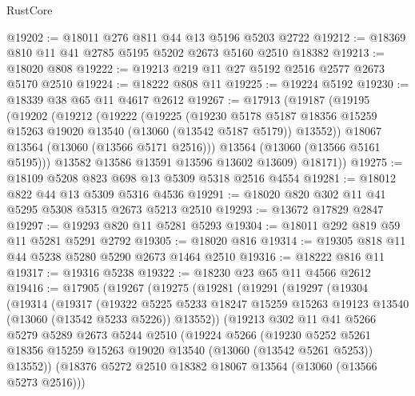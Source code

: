 \begin{lexlean}{RustCore}
\begin{coremodule}
@19202 := @18011 @276 @811 @44 @13 @5196 @5203 @2722
@19212 := @18369 @810 @11 @41 @2785 @5195 @5202 @2673 @5160 @2510 @18382
@19213 := @18020 @808
@19222 := @19213 @219 @11 @27 @5192 @2516 @2577 @2673 @5170 @2510
@19224 := @18222 @808 @11
@19225 := @19224 @5192
@19230 := @18339 @38 @65 @11 @4617 @2612
@19267 := @17913
    (@19187
      (@19195
        (@19202
          (@19212
            (@19222
              (@19225
                (@19230
                  @5178
                  @5187
                  @18356
                  @15259
                  @15263
                  @19020
                  @13540
                  (@13060 (@13542 @5187 @5179))
                  @13552))
              @18067
              @13564
              (@13060 (@13566 @5171 @2516)))
            @13564
            (@13060 (@13566 @5161 @5195)))
          @13582
          @13586
          @13591
          @13596
          @13602
          @13609)
        @18171))
@19275 := @18109 @5208 @823 @698 @13 @5309 @5318 @2516 @4554
@19281 := @18012 @822 @44 @13 @5309 @5316 @4536
@19291 := @18020 @820 @302 @11 @41 @5295 @5308 @5315 @2673 @5213 @2510
@19293 := @13672 @17829 @2847
@19297 := @19293 @820 @11 @5281 @5293
@19304 := @18011 @292 @819 @59 @11 @5281 @5291 @2792
@19305 := @18020 @816
@19314 := @19305 @818 @11 @44 @5238 @5280 @5290 @2673 @1464 @2510
@19316 := @18222 @816 @11
@19317 := @19316 @5238
@19322 := @18230 @23 @65 @11 @4566 @2612
@19416 := @17905
    (@19267
      (@19275
        (@19281
          (@19291
            (@19297
              (@19304
                (@19314
                  (@19317
                    (@19322
                      @5225
                      @5233
                      @18247
                      @15259
                      @15263
                      @19123
                      @13540
                      (@13060 (@13542 @5233 @5226))
                      @13552))
                  (@19213
                    @302
                    @11
                    @41
                    @5266
                    @5279
                    @5289
                    @2673
                    @5244
                    @2510
                    (@19224
                      @5266
                      (@19230
                        @5252
                        @5261
                        @18356
                        @15259
                        @15263
                        @19020
                        @13540
                        (@13060 (@13542 @5261 @5253))
                        @13552))
                    (@18376 @5272 @2510 @18382 @18067 @13564 (@13060 (@13566 @5273 @2516)))

\end{coremodule}
\end{lexlean}
